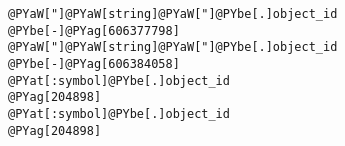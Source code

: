 \begin{Verbatim}[commandchars=@\[\]]
@PYaW["]@PYaW[string]@PYaW["]@PYbe[.]object_id
@PYbe[-]@PYag[606377798]
@PYaW["]@PYaW[string]@PYaW["]@PYbe[.]object_id
@PYbe[-]@PYag[606384058]
@PYat[:symbol]@PYbe[.]object_id
@PYag[204898]
@PYat[:symbol]@PYbe[.]object_id
@PYag[204898]
\end{Verbatim}
